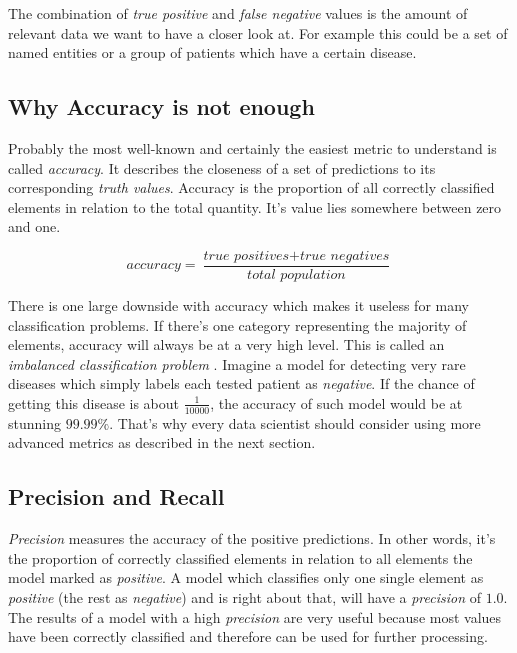 The combination of \emph{true positive} and \emph{false negative} values is the amount of relevant data we want to have a closer look at. For example this could be a set of named entities or a group of patients which have a certain disease.

\subsection{Why Accuracy is not enough}
\label{chap:accuracy}
Probably the most well-known and certainly the easiest metric to understand is called \emph{accuracy}. It describes the
closeness of a set of predictions to its corresponding \emph{truth values}. Accuracy is the proportion of all correctly classified
elements in relation to the total quantity. It's value lies somewhere between zero and one.

\begin{equation}
    \label{math:accuracy}
    accuracy = \frac{\textit{true positives} + \textit{true negatives}}{\textit{total population}}
\end{equation}

There is one large downside with accuracy which makes it useless for many classification problems. If there's one category
representing the majority of elements, accuracy will always be at a very high level. This is called an \emph{imbalanced
classification problem} \cite{koehrsen}. Imagine a model for detecting very rare diseases which simply labels each tested patient
as \emph{negative}. If the chance of getting this disease is about \(\frac{1}{10000}\), the accuracy of such model would be at
stunning $99.99\%$. That's why every data scientist should consider using more advanced metrics as described in the next section.

\subsection{Precision and Recall}

\emph{Precision} measures the accuracy of the positive predictions. In other words, it's the proportion of correctly classified
elements in relation to all elements the model marked as \emph{positive}. A model which classifies only one single element as
\emph{positive} (the rest as \emph{negative}) and is right about that, will have a \emph{precision} of $1.0$. The results of a
model with a high \emph{precision} are very useful because most values have been correctly classified and therefore can be used
for further processing.

